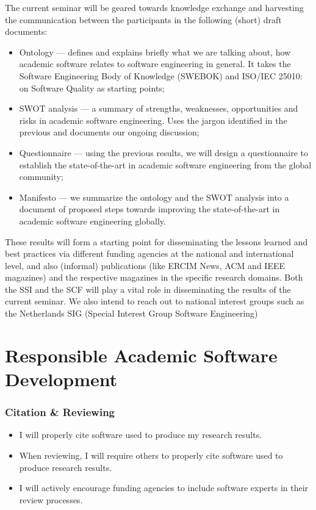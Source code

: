 \documentclass[a4paper,UKenglish]{dagman}
\renewcommand{\paragraph}[1]{\subsubsection*{#1}\xspace}
\begin{document}
The current seminar will be geared towards knowledge exchange and harvesting the communication between the participants in the following (short) draft documents:
\begin{itemize}
\item Ontology --- defines and explains briefly what we are talking about, how academic software relates to software engineering in general. It takes the Software Engineering Body of Knowledge (SWEBOK)\footnotemark {} and ISO/IEC 25010:\footnotemark~ on Software Quality as starting points; 
\item SWOT analysis --- a summary of strengths, weaknesses, opportunities and risks in academic software engineering. Uses the jargon identified in the previous and documents our ongoing discussion;
\item Questionnaire --- using the previous results, we will design a questionnaire to establish the state-of-the-art in academic software engineering from the global community;
\item Manifesto --- we summarize the ontology and the SWOT analysis into a document of proposed steps towards improving the state-of-the-art in academic software engineering globally.
\end{itemize} 

These results will form a starting point for disseminating the lessons learned and best practices via different funding agencies at the national and international level, and also (informal) publications (like ERCIM News, ACM and IEEE magazines) and the respective magazines in the specific research domains. Both the SSI and the SCF will play a vital role in disseminating the results of the current seminar. We also intend to reach out to national interest groups such as the Netherlands SIG (Special Interest Group Software Engineering)


\section{Responsible Academic Software Development}




\paragraph{Citation \& Reviewing}
\begin{itemize}
\item I will properly cite software used to produce my research results.
\item When reviewing, I will require others to properly cite software used to produce research results.
\item I will actively encourage funding agencies to include software experts in their review processes.
\end{itemize}
\end{document}
